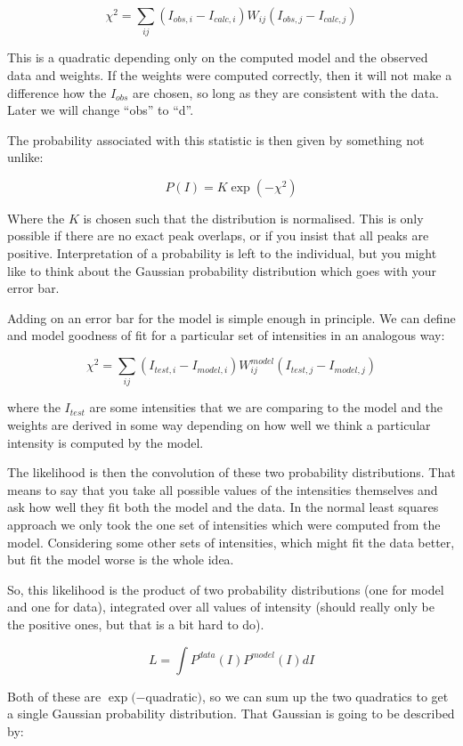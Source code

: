 \documentclass[10pt,a4paper,twoside,notitlepage]{report}
\begin{document}
\[ \chi^2 = \sum_{ij} (I_{obs,i}-I_{calc,i})W_{ij}(I_{obs,j}-I_{calc,j}) \]

This is a quadratic depending only on the computed model and the observed 
data and weights. If the weights were computed correctly, then it will
not make a difference how the $I_{obs}$ are chosen, so long as they
are consistent with the data. Later we will change ``obs'' to ``d''.

The probability associated with this statistic is then given by something
not unlike:

\[ P(I) = K \exp(-\chi^2) \]

Where the $K$ is chosen such that the distribution is normalised. This
is only possible if there are no exact peak overlaps, or if you insist
that all peaks are positive. Interpretation of a probability is left to the
individual, but you might like to think about the Gaussian probability 
distribution which goes with your error bar.

Adding on an error bar for the model is simple enough in principle. We can
define and model goodness of fit for a particular set of intensities in 
an analogous way:

\[ \chi^2 = \sum_{ij} (I_{test,i}-I_{model,i})W^{model}_{ij}(I_{test,j}-I_{model,j}) \]

where the $I_{test}$ are some intensities that we are comparing to the model and 
the weights are derived in some way depending on how well we think a particular
intensity is computed by the model.

The likelihood is then the convolution of these two probability distributions. That
means to say that you take all possible values of the intensities themselves 
and ask how well they fit both the model and the data.
In the normal least squares approach we only took the one set of intensities which
were computed from the model. 
Considering some other sets of intensities, which might fit the data better, but fit
the model worse is the whole idea.

So, this likelihood is the product of two probability distributions (one for model
and one for data), integrated over all values of intensity (should really only be 
the positive ones, but that is a bit hard to do).

\[ L = \int P^{data}(I) P^{model}(I) dI \]

Both of these are $\exp(-$quadratic$)$, so we can sum up the two quadratics to 
get a single Gaussian probability distribution. That Gaussian is going 
to be described by:
\end{document}
